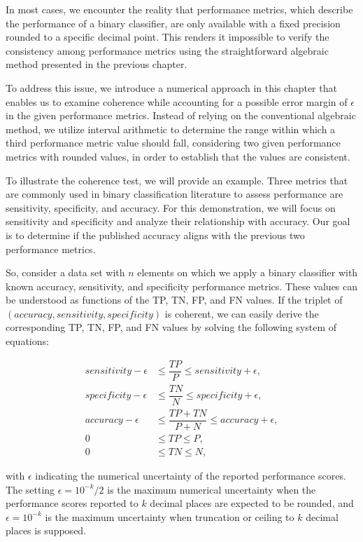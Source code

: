 \documentclass[3p,times]{elsarticle}
\begin{document}
In most cases, we encounter the reality that performance metrics, which describe the performance of a binary classifier, are only available with a fixed precision rounded to a specific decimal point. This renders it impossible to verify the consistency among performance metrics using the straightforward algebraic method presented in the previous chapter.

To address this issue, we introduce a numerical approach in this chapter that enables us to examine coherence while accounting for a possible error margin of $\epsilon$ in the given performance metrics. Instead of relying on the conventional algebraic method, we utilize interval arithmetic to determine the range within which a third performance metric value should fall, considering two given performance metrics with rounded values, in order to establish that the values are consistent.

To illustrate the coherence test, we will provide an example. Three metrics that are commonly used in binary classification literature to assess performance are sensitivity, specificity, and accuracy. For this demonstration, we will focus on sensitivity and specificity and analyze their relationship with accuracy. Our goal is to determine if the published accuracy aligns with the previous two performance metrics.

So, consider a data set with $n$ elements on which we apply a binary classifier with known accuracy, sensitivity, and specificity performance metrics. These values can be understood as functions of the TP, TN, FP, and FN values. If the triplet of $(accuracy, sensitivity, specificity)$ is coherent, we can easily derive the corresponding TP, TN, FP, and FN values by solving the following system of equations:

\begin{align}
sensitivity - \epsilon &\leq \dfrac{TP}{P} \leq sensitivity + \epsilon,\label{eq0}\\
specificity - \epsilon &\leq \dfrac{TN}{N} \leq specificity + \epsilon,\label{eq1}\\
accuracy - \epsilon &\leq \dfrac{TP+TN}{P+N} \leq accuracy + \epsilon,\label{eq2}\\
0 &\leq TP\leq P, \label{eq3}\\
0 &\leq TN\leq N, \label{eq4}
\end{align}

\noindent
with $\epsilon$ indicating the numerical uncertainty of the reported performance scores. The setting $\epsilon = 10^{-k}/2$ is the maximum numerical uncertainty when the performance scores reported to $k$ decimal places are expected to be rounded, and $\epsilon = 10^{-k}$ is the maximum uncertainty when truncation or ceiling to $k$ decimal places is supposed.
\end{document}
